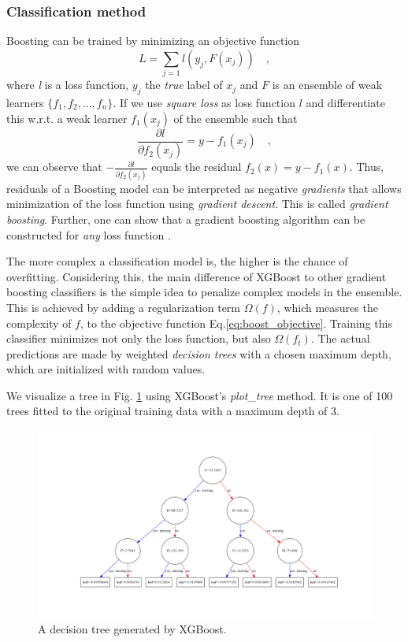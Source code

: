 \subsubsection{Classification method}
Boosting can be trained by minimizing an objective function
\begin{equation}\label{eq:boost_objective}
	L = \sum\limits_{j=1} l ( y_j,F(x_j)) \mathrm{\hspace{1em},}
\end{equation}
where \emph{l} is a loss function, $y_j$ the \emph{true} label of $x_j$ and $F$ is an ensemble of weak learners $\{f_1,f_2,\ldots,f_n\}$. If we use \emph{square loss} as loss function $l$ and differentiate this w.r.t. a weak learner $f_1(x_j)$ of the ensemble such that
\begin{equation}\label{eq:boostloss}
	\frac{\partial l}{\partial f_2(x_j)} = y - f_1(x_j) \mathrm{\hspace{1em},}
\end{equation}
we can observe that $- \frac{\partial l}{\partial f_2(x_j)}$ equals the residual $f_2(x) = y - f_1(x)$.
Thus, residuals of a Boosting model can be interpreted as negative \emph{gradients} that allows minimization of the loss function using \emph{gradient descent}. This is called \emph{gradient boosting}. Further, one can show that a gradient boosting algorithm can be constructed for \emph{any} loss function \cite{gradboost}.

The more complex a classification model is, the higher is the chance of overfitting. Considering this, the main difference of XGBoost to other gradient boosting classifiers is the simple idea to penalize complex models in the ensemble. This is achieved by adding a regularization term $\Omega(f)$, which measures the complexity of $f$, to the objective function Eq.\eqref{eq:boost_objective}. Training this classifier minimizes not only the loss function, but also $\Omega(f_t)$.
The actual predictions are made by weighted \emph{decision trees} with a chosen maximum depth, which are initialized with random values.

We visualize a tree in Fig. \ref{fig:tree} using XGBoost's \emph{plot\_tree} method. It is one of 100 trees fitted to the original training data with a maximum depth of 3.
\begin{figure}[h]
\begin{center}
\includegraphics[trim=146 100 118 90, clip, width=\textwidth]{images/tree.pdf}
\caption{A decision tree generated by XGBoost.}
\label{fig:tree}
\end{center}
\end{figure}
